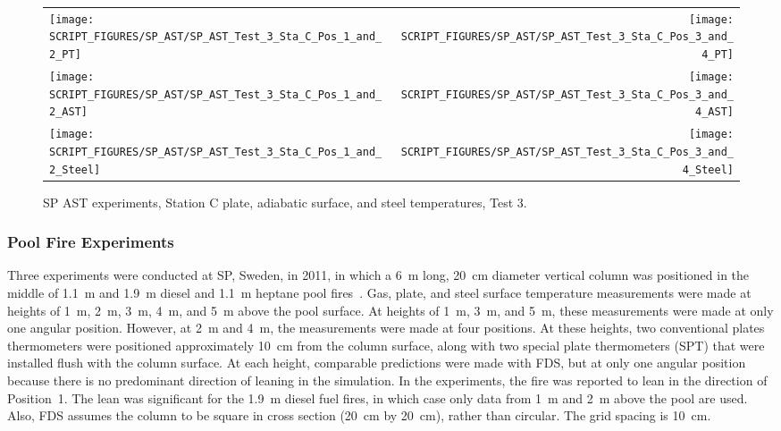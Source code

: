\begin{figure}[p]
\begin{tabular*}{\textwidth}{l@{\extracolsep{\fill}}r}
\texttt{[image: SCRIPT\_FIGURES/SP\_AST/SP\_AST\_Test\_3\_Sta\_C\_Pos\_1\_and\_2\_PT]} &
\texttt{[image: SCRIPT\_FIGURES/SP\_AST/SP\_AST\_Test\_3\_Sta\_C\_Pos\_3\_and\_4\_PT]} \\
\texttt{[image: SCRIPT\_FIGURES/SP\_AST/SP\_AST\_Test\_3\_Sta\_C\_Pos\_1\_and\_2\_AST]} &
\texttt{[image: SCRIPT\_FIGURES/SP\_AST/SP\_AST\_Test\_3\_Sta\_C\_Pos\_3\_and\_4\_AST]} \\
\texttt{[image: SCRIPT\_FIGURES/SP\_AST/SP\_AST\_Test\_3\_Sta\_C\_Pos\_1\_and\_2\_Steel]} &
\texttt{[image: SCRIPT\_FIGURES/SP\_AST/SP\_AST\_Test\_3\_Sta\_C\_Pos\_3\_and\_4\_Steel]}
\end{tabular*}
\caption[SP AST experiments, Station C plate, adiabatic surface, and steel temperatures, Test 3]{SP AST experiments, Station C plate, adiabatic surface, and steel temperatures, Test 3.}
\label{SP_Test_3_Station_C}
\end{figure}

\clearpage

\subsubsection{Pool Fire Experiments}

Three experiments were conducted at SP, Sweden, in 2011, in which a 6~m long, 20~cm diameter vertical column was positioned in the middle of 1.1~m and 1.9~m diesel and 1.1~m heptane pool fires~\cite{Sjostrom:AST}. Gas, plate, and steel surface temperature measurements were made at heights of 1~m, 2~m, 3~m, 4~m, and 5~m above the pool surface. At heights of 1~m, 3~m, and 5~m, these measurements were made at only one angular position. However, at 2~m and 4~m, the measurements were made at four positions. At these heights, two conventional plates thermometers were positioned approximately 10~cm from the column surface, along with two special plate thermometers (SPT) that were installed flush with the column surface. At each height, comparable predictions were made with FDS, but at only one angular position because there is no predominant direction of leaning in the simulation. In the experiments, the fire was reported to lean in the direction of Position~1. The lean was significant for the 1.9~m diesel fuel fires, in which case only data from 1~m and 2~m above the pool are used. Also, FDS assumes the column to be square in cross section (20~cm by 20~cm), rather than circular. The grid spacing is 10~cm.

